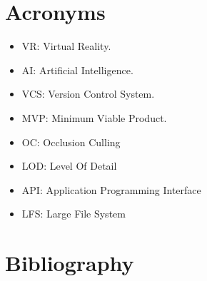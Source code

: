 \documentclass[12pt]{article}
\begin{document}
\section{Acronyms}
\begin{itemize}
    \item VR: Virtual Reality.
    \item AI: Artificial Intelligence.
    \item VCS: Version Control System.
    \item MVP: Minimum Viable Product.
	\item OC: Occlusion Culling
	\item LOD: Level Of Detail
	\item API: Application Programming Interface
	\item LFS: Large File System
\end{itemize}

\section{Bibliography}
\end{document}
